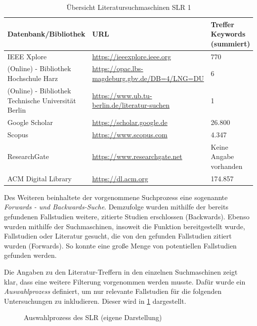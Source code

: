 \begin{table}[ht]
	\centering
	\small
	\caption{Übersicht Literatursuchmaschinen SLR 1}
	\begin{tabular}{|p{5cm}|p{7cm}||p{3cm}|}
		\hline
		\textbf{Datenbank/Bibliothek}& \textbf{URL} &  \textbf{Treffer Keywords  (summiert)} \\
		\hline
		IEEE Xplore & \url{https://ieeexplore.ieee.org} & 770 \\
		(Online) - Bibliothek Hochschule Harz & \url{https://opac.lbs-magdeburg.gbv.de/DB=4/LNG=DU} & 6 \\
		(Online) - Bibliothek Technische Universität Berlin  & \url{https://www.ub.tu-berlin.de/literatur-suchen}& 1 \\
		Google Scholar &  \url{https://scholar.google.de}  & 26.800 \\
		Scopus & \url{https://www.scopus.com} & 4.347 \\
		ResearchGate & \url{https://www.researchgate.net} &Keine Angabe vorhanden \footnotemark \\ 
		ACM Digital Library & \url{https://dl.acm.org} & 174.857 \\
		\hline
	\end{tabular}
	\label{tab:suchmaschinenslr1}
\end{table}


Des Weiteren beinhaltete der vorgenommene Suchprozess eine sogenannte \textit{Forwards - und Backwards-Suche}. Demzufolge wurden mithilfe der bereits gefundenen Fallstudien weitere, zitierte Studien erschlossen (Backwards). Ebenso wurden mithilfe der Suchmaschinen, insoweit die Funktion bereitgestellt wurde, Fallstudien oder Literatur gesucht, die von den gefunden Fallstudien zitiert wurden (Forwards). So konnte eine große Menge von potentiellen Fallstudien  gefunden werden.

Die Angaben zu den Literatur-Treffern in den einzelnen Suchmaschinen zeigt klar, dass eine weitere Filterung vorgenommen werden musste. Dafür wurde ein \textit{Auswahlprozess} definiert, um nur relevante Fallstudien für die folgenden Untersuchungen zu inkludieren. Dieser wird in \ref{fig:auswahlprozess} dargestellt.

\begin{figure}[H]
	\centering
	\caption[Auswahlprozess des SLR]{Auswahlprozess des SLR (eigene Darstellung)}
	\label{fig:auswahlprozess}
\end{figure}

